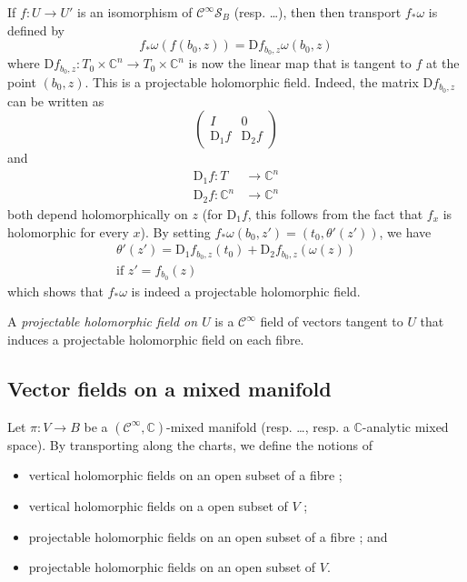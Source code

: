 \documentclass{article}
\theoremstyle{plain}
\theoremstyle{definition}
\newcommand{\CC}{\mathbb{C}}
\newcommand{\DD}{\mathrm{D}}
\begin{document}
If $f\colon U\to U'$ is an isomorphism of $\mathscr{C}^\infty\mathscr{S}_B$ (resp. \ldots), then then transport $f_*\omega$ is defined by
\[
  f_*\omega(f(b_0,z)) = \DD f_{b_0,z}\omega(b_0,z)
\]
where $\DD f_{b_0,z}\colon T_0\times\CC^n\to T_0\times\CC^n$ is now the linear map that is tangent to $f$ at the point $(b_0,z)$.
This is a projectable holomorphic field.
Indeed, the matrix $\DD f_{b_0,z}$ can be written as
\[
  \begin{pmatrix}
    I & 0
  \\\DD_1f & \DD_2f
  \end{pmatrix}
\]
and
\[
  \begin{aligned}
    \DD_1f\colon T &\to \CC^n
  \\\DD_2f\colon \CC^n &\to \CC^n
  \end{aligned}
\]
both depend holomorphically on $z$ (for $\DD_1f$, this follows from the fact that $f_x$ is holomorphic for every $x$).
By setting $f_*\omega(b_0,z')=(t_0,\theta'(z'))$, we have
\[
  \begin{gathered}
    \theta'(z') = \DD_1f_{b_0,z}(t_0) + \DD_2f_{b_0,z}(\omega(z))
  \\\mbox{if $z'=f_{b_0}(z)$}
  \end{gathered}
\]
which shows that $f_*\omega$ is indeed a projectable holomorphic field.

A \emph{projectable holomorphic field on $U$} is a $\mathscr{C}^\infty$ field of vectors tangent to $U$ that induces a projectable holomorphic field on each fibre.


\subsection{Vector fields on a mixed manifold}
\label{III.2}

Let $\pi\colon V\to B$ be a $(\mathscr{C}^\infty,\CC)$-mixed manifold (resp. \ldots, resp. a $\CC$-analytic mixed space).
By transporting along the charts, we define the notions of
\begin{itemize}
  \item vertical holomorphic fields on an open subset of a fibre ;
  \item vertical holomorphic fields on a open subset of $V$ ;
  \item projectable holomorphic fields on an open subset of a fibre ; and
  \item projectable holomorphic fields on an open subset of $V$.
\end{itemize}
\end{document}
